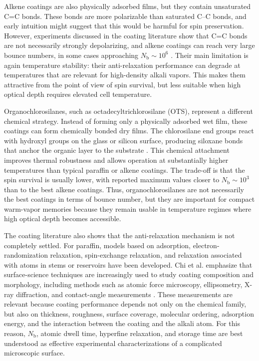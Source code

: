 Alkene coatings are also physically adsorbed films, but they contain unsaturated C=C bonds. These bonds are more polarizable than saturated C--C bonds, and early intuition might suggest that this would be harmful for spin preservation. However, experiments discussed in the coating literature show that C=C bonds are not necessarily strongly depolarizing, and alkene coatings can reach very large bounce numbers, in some cases approaching \(N_{\text{b}}\sim 10^6\) \cite{Aiacoavc_ChiEtAl_2020}. Their main limitation is again temperature stability: their anti-relaxation performance can degrade at temperatures that are relevant for high-density alkali vapors. This makes them attractive from the point of view of spin survival, but less suitable when high optical depth requires elevated cell temperature.

Organochlorosilanes, such as octadecyltrichlorosilane (OTS), represent a different chemical strategy. Instead of forming only a physically adsorbed wet film, these coatings can form chemically bonded dry films. The chlorosilane end groups react with hydroxyl groups on the glass or silicon surface, producing siloxane bonds that anchor the organic layer to the substrate \cite{Aiacoavc_ChiEtAl_2020}. This chemical attachment improves thermal robustness and allows operation at substantially higher temperatures than typical paraffin or alkene coatings. The trade-off is that the spin survival is usually lower, with reported maximum values closer to \(N_{\text{b}}\sim 10^3\) than to the best alkene coatings. Thus, organochlorosilanes are not necessarily the best coatings in terms of bounce number, but they are important for compact warm-vapor memories because they remain usable in temperature regimes where high optical depth becomes accessible.

The coating literature also shows that the anti-relaxation mechanism is not completely settled. For paraffin, models based on adsorption, electron-randomization relaxation, spin-exchange relaxation, and relaxation associated with atoms in stems or reservoirs have been developed. Chi et al. emphasize that surface-science techniques are increasingly used to study coating composition and morphology, including methods such as atomic force microscopy, ellipsometry, X-ray diffraction, and contact-angle measurements \cite{Aiacoavc_ChiEtAl_2020}. These measurements are relevant because coating performance depends not only on the chemical family, but also on thickness, roughness, surface coverage, molecular ordering, adsorption energy, and the interaction between the coating and the alkali atom. For this reason, \(N_{\text{b}}\), atomic dwell time, hyperfine relaxation, and storage time are best understood as effective experimental characterizations of a complicated microscopic surface.

